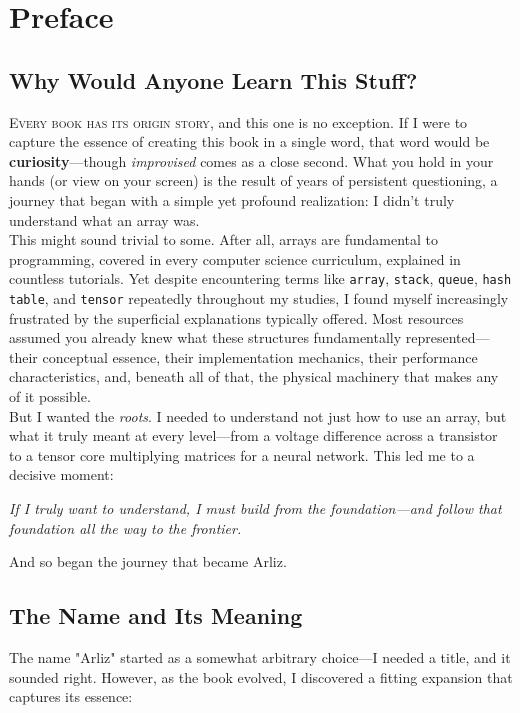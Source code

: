 \chapter{Preface}

\section*{Why Would Anyone Learn This Stuff?}

\lettrine{E}{very book has its origin story}, and this one is no exception. If I were to capture the essence of creating this book in a single word, that word would be \textbf{curiosity}---though \emph{improvised} comes as a close second. What you hold in your hands (or view on your screen) is the result of years of persistent questioning, a journey that began with a simple yet profound realization: I didn't truly understand what an array was.\\
This might sound trivial to some. After all, arrays are fundamental to programming, covered in every computer science curriculum, explained in countless tutorials. Yet despite encountering terms like \texttt{array}, \texttt{stack}, \texttt{queue}, \texttt{hash table}, and \texttt{tensor} repeatedly throughout my studies, I found myself increasingly frustrated by the superficial explanations typically offered. Most resources assumed you already knew what these structures fundamentally represented---their conceptual essence, their implementation mechanics, their performance characteristics, and, beneath all of that, the physical machinery that makes any of it possible.\\
But I wanted the \emph{roots}. I needed to understand not just how to use an array, but what it truly meant at every level---from a voltage difference across a transistor to a tensor core multiplying matrices for a neural network. This led me to a decisive moment:

\begin{center}
	\emph{If I truly want to understand, I must build from the foundation---and follow that foundation all the way to the frontier.}
\end{center}

And so began the journey that became Arliz.

\section*{The Name and Its Meaning}

The name "Arliz" started as a somewhat arbitrary choice---I needed a title, and it sounded right. However, as the book evolved, I discovered a fitting expansion that captures its essence:

